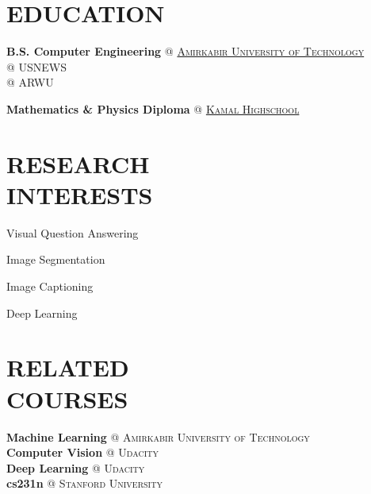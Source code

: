 \documentclass[margin, 10pt]{res} %
\begin{document}
    \begin{resume}
    
     
    \section{EDUCATION}  
    \textbf{B.S. Computer Engineering} \textsc{@}
	   \href{http://aut.ac.ir/aut/}{\textsc{Amirkabir University of Technology}}\\
	   { @ USNEWS}\hfill {}\\
	   { @ ARWU}
 	\vspace{0.1cm}
 	
    \textbf{Mathematics \& Physics Diploma} \textsc{@}
    \href{http://www.kamal.sch.ir/}{\textsc{Kamal Highschool}}\hfill {}

	\section{RESEARCH \\ INTERESTS}
	\vspace{0.6cm}
		  	
	 \begin{innerlist}
	\begin{minipage}{0.4\linewidth}
		\item Visual Question Answering
		\item Image Segmentation
	\end{minipage}
	\begin{minipage}{0.4\linewidth}	
		\item Image Captioning
		\item Deep Learning
	\end{minipage}
\end{innerlist}
		\vspace{0.2cm}
		
  	\section{RELATED \\ COURSES}
	\textbf{Machine Learning} \textsc{@} \textsc{Amirkabir University of Technology}\\
	\textbf{Computer Vision} \textsc{@} \textsc{Udacity}\\
	\textbf{Deep Learning} \textsc{@} \textsc{Udacity}\\
	\textbf{cs231n} \textsc{@} \textsc{Stanford University}\\

\end{resume}
\end{document}
